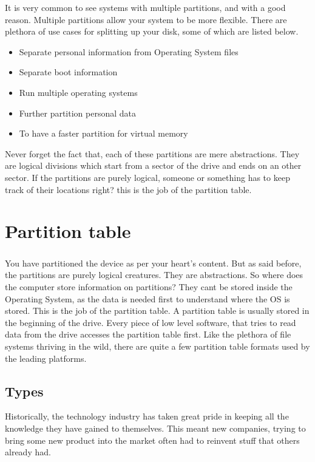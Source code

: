 It is very common to see systems with multiple partitions, and with a good
reason. Multiple partitions allow your system to be more flexible. There are
plethora of use cases for splitting up your disk, some of which are listed
below.

\begin{itemize}
    \item Separate personal information from Operating System files
    \item Separate boot information
    \item Run multiple operating systems
    \item Further partition personal data
    \item To have a faster partition for virtual memory
\end{itemize}

Never forget the fact that, each of these partitions are mere abstractions. They
are logical divisions which start from a sector of the drive and ends on an
other sector. If the partitions are purely logical, someone or something has to
keep track of their locations right? this is the job of the partition table.


\chapter{Partition table}
\paragraph{}
You have partitioned the device as per your heart's content. But as said before,
the partitions are purely logical creatures. They are abstractions. So where
does the computer store information on partitions? They cant be stored inside
the Operating System, as the data is needed first to understand where the OS is
stored. This is the job of the partition table. A partition table is usually
stored in the beginning of the drive. Every piece of low level software, that
tries to read data from the drive accesses the partition table first. Like the
plethora of file systems thriving in the wild, there are quite a few partition
table formats used by the leading platforms.

\section{Types}
Historically, the technology industry has taken great pride in keeping all the
knowledge they have gained to themselves. This meant new companies, trying to
bring some new product into the market often had to reinvent stuff that others
already had.\\

